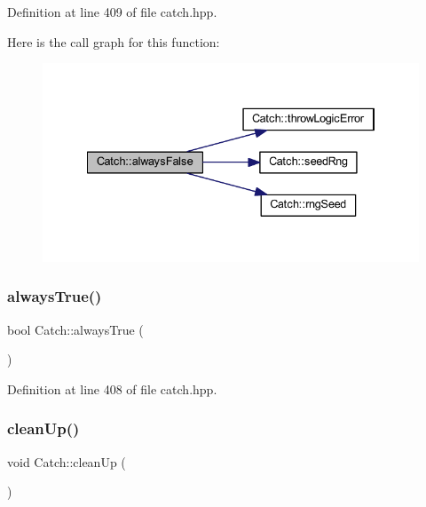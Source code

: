 Definition at line 409 of file catch.\+hpp.

Here is the call graph for this function\+:\nopagebreak
\begin{figure}[H]
\begin{center}
\leavevmode
\includegraphics[width=334pt]{namespace_catch_ad425271249dd02956a9709e78b8b2783_cgraph}
\end{center}
\end{figure}
\hypertarget{namespace_catch_a129be2186a2f6546206ec52c4bf2156f}{}\label{namespace_catch_a129be2186a2f6546206ec52c4bf2156f} 
\subsubsection{\texorpdfstring{always\+True()}{alwaysTrue()}}
{\footnotesize\ttfamily bool Catch\+::always\+True (\begin{DoxyParamCaption}{ }\end{DoxyParamCaption})\hspace{0.3cm}{\ttfamily [inline]}}



Definition at line 408 of file catch.\+hpp.

\hypertarget{namespace_catch_a0f78e9afdebc6d4512d18e76fbf54b8c}{}\label{namespace_catch_a0f78e9afdebc6d4512d18e76fbf54b8c} 
\subsubsection{\texorpdfstring{clean\+Up()}{cleanUp()}}
{\footnotesize\ttfamily void Catch\+::clean\+Up (\begin{DoxyParamCaption}{ }\end{DoxyParamCaption})}

\hypertarget{namespace_catch_ae50508f10ffc4ed873a31a4db4caea16}{}\label{namespace_catch_ae50508f10ffc4ed873a31a4db4caea16} 
